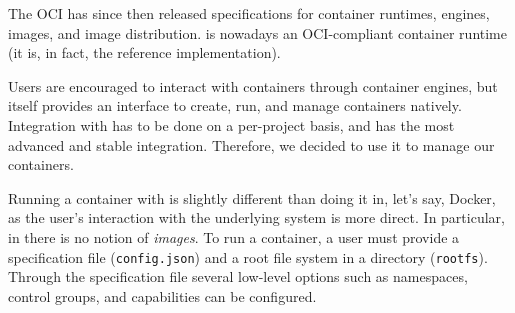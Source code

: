 The OCI has since then released specifications for container runtimes, engines, images, and image distribution.
\runc is nowadays an OCI-compliant container runtime (it is, in fact, the reference implementation).

Users are encouraged to interact with containers through container engines, but \runc itself provides an interface to create, run, and manage containers natively.
Integration with \criu has to be done on a per-project basis, and \runc has the most advanced and stable integration.
Therefore, we decided to use it to manage our containers.

Running a container with \runc is slightly different than doing it in, let's say, Docker, as the user's interaction with the underlying system is more direct.
In particular, in \runc there is no notion of \textit{images}.
To run a container, a user must provide a specification file (\texttt{config.json}) and a root file system in a directory (\texttt{rootfs}).
Through the specification file several low-level options such as namespaces, control groups, and capabilities can be configured.
